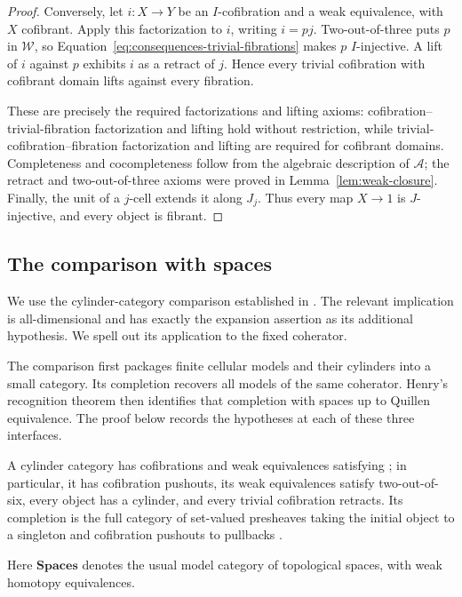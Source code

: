\documentclass[11pt,letterpaper]{article}
\numberwithin{equation}{section}
\theoremstyle{plain}
\theoremstyle{definition}
\theoremstyle{remark}
\newcommand{\Spaces}{\mathbf{Spaces}}
\begin{document}
\begin{proof}
Conversely, let \(i:X\to Y\) be an \(I\)-cofibration and a weak
equivalence, with \(X\) cofibrant.  Apply this factorization to \(i\),
writing \(i=pj\).  Two-out-of-three puts \(p\) in \(\mathcal W\),
so Equation~\eqref{eq:consequences-trivial-fibrations} makes \(p\)
\(I\)-injective.  A lift of \(i\) against \(p\) exhibits \(i\)
as a retract of \(j\).  Hence every trivial cofibration with
cofibrant domain lifts against every fibration.

These are precisely the required factorizations and lifting axioms:
cofibration--trivial-fibration factorization and lifting hold without
restriction, while trivial-cofibration--fibration factorization and
lifting are required for cofibrant domains.  Completeness and
cocompleteness follow from the algebraic description of \(\mathcal A\);
the retract and two-out-of-three axioms were proved in
Lemma~\ref{lem:weak-closure}.  Finally, the unit of a \(j\)-cell
extends it along \(J_j\).  Thus every map \(X\to 1\) is
\(J\)-injective, and every object is fibrant.
\end{proof}

\subsection{The comparison with spaces}

We use the cylinder-category comparison established in
\cite[Sections~5.1 and~5.3]{Henry2016}.  The relevant implication is
all-dimensional and has exactly the expansion assertion as its
additional hypothesis.  We spell out its application to the fixed
coherator.

The comparison first packages finite cellular models and their
cylinders into a small category.  Its completion recovers all models
of the same coherator.  Henry's recognition theorem then identifies
that completion with spaces up to Quillen equivalence.  The proof
below records the hypotheses at each of these three interfaces.

A cylinder category has cofibrations and weak equivalences satisfying
\cite[Definition~2.1.1]{Henry2016}; in particular, it has cofibration
pushouts, its weak equivalences satisfy two-out-of-six, every object
has a cylinder, and every trivial cofibration retracts.  Its completion
is the full category of set-valued presheaves taking the initial object
to a singleton and cofibration pushouts to pullbacks
\cite[Definition~2.4.1]{Henry2016}.

Here \(\Spaces\) denotes the usual model category of topological spaces,
with weak homotopy equivalences.
\end{document}
